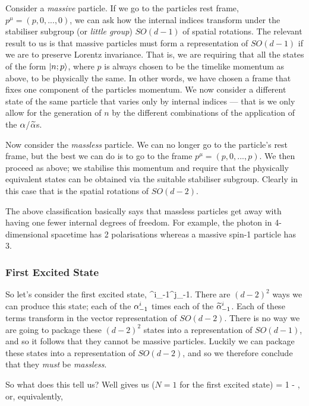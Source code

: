 Consider a \textit{massive} particle. If we go to the particles rest frame, $p^{\mu}=(p,0,...,0)$, we can ask how the internal indices transform under the stabiliser subgroup (or \textit{little group}) $SO(d-1)$ of spatial rotations. The relevant result to us is that massive particles must form a representation of $SO(d-1)$ if we are to preserve Lorentz invariance. That is, we are requiring that all the states of the form $\ket{n;p}$, where $p$ is always chosen to be the timelike momentum as above, to be physically the same. In other words, we have chosen a frame that fixes one component of the particles momentum. We now consider a different state of the same particle that varies only by internal indices --- that is we only allow for the generation of $n$ by the different combinations of the application of the $\alpha$/$\widetilde{\alpha}$s. 

Now consider the \textit{massless} particle. We can no longer go to the particle's rest frame, but the best we can do is to go to the frame $p^{\mu} = (p,0,...,p)$. We then proceed as above; we stabilise this momentum and require that the physically equivalent states can be obtained via the suitable stabiliser subgroup. Clearly in this case that is the spatial rotations of $SO(d-2)$.

The above classification basically says that massless particles get away with having one fewer internal degrees of freedom. For example, the photon in 4-dimensional spacetime has 2 polarisations whereas a massive spin-1 particle has 3. 

\subsubsection*{First Excited State}

So let's consider the first excited state,
\be 
\label{eqn:FirstExcitedState}
    ^i_{-1}\a^j_{-1}.
\ee 
There are $(d-2)^2$ ways we can produce this state; each of the $\alpha^i_{-1}$ times each of the $\widetilde{\alpha}^i_{-1}$. Each of these terms transform in the vector representation of $SO(d-2)$. There is no way we are going to package these $(d-2)^2$ states into a representation of $SO(d-1)$, and so it follows that they cannot be massive particles. Luckily we can package these states into a representation of $SO(d-2)$, and so we therefore conclude that they \textit{must} be \textit{massless}.

So what does this tell us? Well  gives us ($N=1$ for the first excited state)
 = 1 - ,
\ese 
or, equivalently, 

